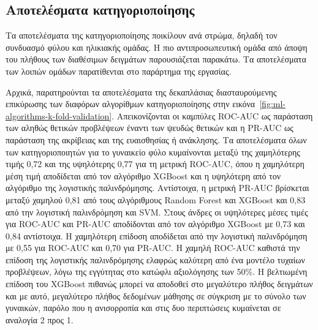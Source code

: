 \documentclass[12pt]{report}
\begin{document}
        \subsection{Αποτελέσματα κατηγοριοποίησης}
                Τα αποτελέσματα της κατηγοριοποίησης ποικίλουν ανά στρώμα, δηλαδή τον συνδυασμό φύλου και ηλικιακής ομάδας. Η πιο αντιπροσωπευτική ομάδα από άποψη του πλήθους των διαθέσιμων δειγμάτων παρουσιάζεται παρακάτω. Τα αποτελέσματα των λοιπών ομάδων παρατίθενται στο παράρτημα της εργασίας.
            \par
                Αρχικά, παρατηρούνται τα αποτελέσματα της δεκαπλάσιας διασταυρούμενης επικύρωσης των διαφόρων αλγορίθμων κατηγοριοποίησης στην εικόνα~\ref{fig:ml-algorithms-k-fold-validation}. Απεικονίζονται οι καμπύλες ROC-AUC ως παράσταση των αληθώς θετικών προβλέψεων έναντι των ψευδώς θετικών και η PR-AUC ως παράσταση της ακρίβειας και της ευαισθησίας ή ανάκλησης. Τα αποτελέσματα όλων των κατηγοριοποιητών για το γυναικείο φύλο κυμαίνονται μεταξύ της χαμηλότερης τιμής 0,72 και της υψηλότερης 0,77 για τη μετρική ROC-AUC, όπου η χαμηλότερη μέση τιμή αποδίδεται από τον αλγόριθμο XGBoost και η υψηλότερη από τον αλγόριθμο της λογιστικής παλινδρόμησης. Αντίστοιχα, η μετρική PR-AUC βρίσκεται μεταξύ χαμηλού 0,81 από τους αλγόριθμους Random Forest και XGBoost και 0,83 από την λογιστική παλινδρόμηση και SVM. Στους άνδρες οι υψηλότερες μέσες τιμές για ROC-AUC και PR-AUC αποδίδονται από τον αλγόριθμο XGBoost με 0,73 και 0,84 αντίστοιχα. Η χαμηλότερη επίδοση αποδίδεται από την λογιστική παλινδρόμηση με 0,55 για ROC-AUC και 0,70 για PR-AUC. Η χαμηλή ROC-AUC καθιστά την επίδοση της λογιστικής παλινδρόμησης ελαφρώς καλύτερη από ένα μοντέλο τυχαίων προβλέψεων, λόγω της εγγύτητας στο κατώφλι αξιολόγησης των 50\%. Η βελτιωμένη επίδοση του XGBoost πιθανώς μπορεί να αποδοθεί στο μεγαλύτερο πλήθος δειγμάτων και με αυτό, μεγαλύτερο πλήθος δεδομένων μάθησης σε σύγκριση με το σύνολο των γυναικών, παρόλο που η ανισορροπία και στις δυο περιπτώσεις κυμαίνεται σε αναλογία 2 προς 1.
\end{document}
